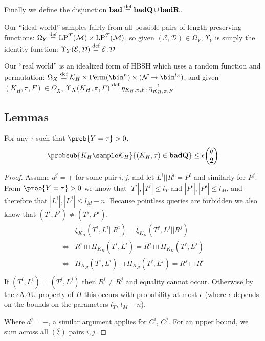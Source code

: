 \documentclass[eprint.tex]{subfiles}
\begin{document}
Finally we define the disjunction
$\operatorname{\mathbf{bad}} \stackrel{\text{def}}{=} \operatorname{\mathbf{badQ}} \cup \operatorname{\mathbf{badR}}$.

Our ``ideal world'' samples fairly from all possible pairs of length-preserving functions:
$\Omega_Y \stackrel{\text{def}}{=} \operatorname{LP}^\mathcal{T}(\mathcal{M}) \times \operatorname{LP}^\mathcal{T}(\mathcal{M})$,
so given $(\mathcal{E}, \mathcal{D}) \in \Omega_Y$, $\Upsilon_Y$ is simply the identity function:
$\Upsilon_Y(\mathcal{E}, \mathcal{D}) \stackrel{\text{def}}{=} \mathcal{E}, \mathcal{D}$

Our ``real world'' is
an idealized form of HBSH which uses a random function and permutation:
$\Omega_X \defeq \mathcal{K}_H \times \Perm(\bin^n) \times (\mathcal{N} \rightarrow \bin^{l_S})$,
and given $(K_H, \pi, F) \in \Omega_X$,
$\Upsilon_X(K_H, \pi, F) \stackrel{\text{def}}{=} \eta_{K_H, \pi, F}, \eta_{K_H, \pi, F}^{-1}$

\subsection{Lemmas}
\begin{lemma} \label{badQ}
    For any $\tau$ such that $\prob{Y = \tau} > 0$,
    \begin{displaymath}
        \probsub{K_H \sample \mathcal{K}_H}{(K_H, \tau) \in \badQ}
        \leq \epsilon \binom{q}{2}
    \end{displaymath}
\end{lemma}

\begin{proof}
Assume $d^j = +$ for some pair $i, j$, and let $L^i || R^i = P^i$ and similarly for $P^j$.
From $\prob{Y = \tau} > 0$ we know that $|T^i|, |T^j| \leq l_T$ and $|P^i|, |P^j| \leq l_M$,
and therefore that $|L^i|, |L^j| \leq l_M - n$.
Because pointless queries are forbidden we also know that $(T^i, P^i) \neq (T^j, P^j)$.
%
\begin{align*}
    &\xi_{K_H}(T^i, L^i||R^i) = \xi_{K_H}(T^j, L^j||R^j) \\
    \Leftrightarrow& R^i \boxplus H_{K_H}(T^i, L^i) = R^j \boxplus H_{K_H}(T^j, L^j) \\
    \Leftrightarrow& H_{K_H}(T^i, L^i) \boxminus H_{K_H}(T^j, L^j) = R^j \boxminus R^i \\
\end{align*}
%
If $(T^i, L^i) = (T^j, L^j)$ then $R^i \neq R^j$ and equality cannot occur.
Otherwise by the $\epsilon$A$\Delta$U property of $H$ this occurs with probability
at most $\epsilon$ (where $\epsilon$ depends on the bounds on
the parameters $l_T$, $l_M -n$).

Where $d^j = -$, a similar argument applies for $C^i$, $C^j$.
For an upper bound, we sum across all $\binom{q}{2}$ pairs $i, j$.
\end{proof}
\end{document}
